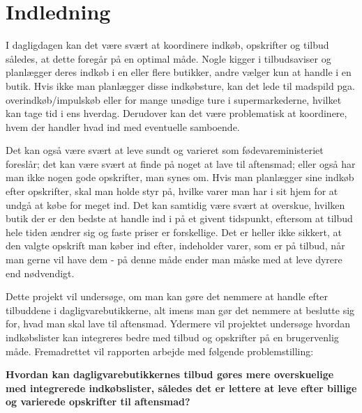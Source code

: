 \chapter{Indledning}

I dagligdagen kan det være svært at koordinere indkøb, opskrifter og tilbud således, at dette foregår på en optimal måde. Nogle kigger i tilbudsaviser og planlægger deres indkøb i en eller flere butikker, andre vælger kun at handle i en butik. Hvis ikke man planlægger disse indkøbsture, kan det lede til madspild pga. overindkøb/impulskøb eller for mange unødige ture i supermarkederne, hvilket kan tage tid i ens hverdag. Derudover kan det være problematisk at koordinere, hvem der handler hvad ind med eventuelle samboende.  

Det kan også være svært at leve sundt og varieret som fødevareministeriet foreslår; det kan være svært at finde på noget at lave til aftensmad; eller også har man ikke nogen gode opskrifter, man synes om. 
Hvis man planlægger sine indkøb efter opskrifter, skal man holde styr på, hvilke varer man har i sit hjem for at undgå at købe for meget ind. Det kan samtidig være svært at overskue, hvilken butik der er den bedste at handle ind i på et givent tidspunkt, eftersom at tilbud hele tiden ændrer sig og faste priser er forskellige. Det er heller ikke sikkert, at den valgte opskrift man køber ind efter, indeholder varer, som er på tilbud, når man gerne vil have dem - på denne måde ender man måske med at leve dyrere end nødvendigt. 

Dette projekt vil undersøge, om man kan gøre det nemmere at handle efter tilbuddene i dagligvarebutikkerne, alt imens man gør det nemmere at beslutte sig for, hvad man skal lave til aftensmad. Ydermere vil projektet undersøge hvordan indkøbslister kan integreres bedre med tilbud og opskrifter på en brugervenlig måde.  Fremadrettet vil rapporten arbejde med følgende problemstilling:

\textbf{Hvordan kan dagligvarebutikkernes tilbud gøres mere overskuelige med integrerede indkøbslister, således det er lettere at leve efter billige og varierede opskrifter til aftensmad?}
